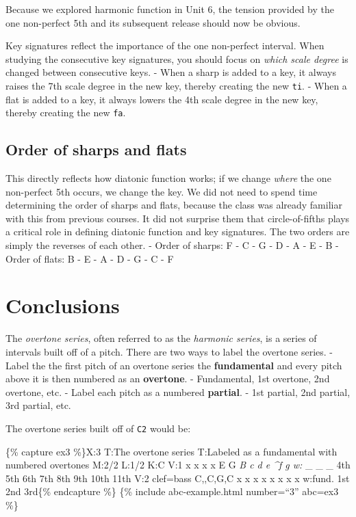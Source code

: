 \documentclass{book}
\begin{document}
Because we explored harmonic function in Unit 6, the tension provided by the
one non-perfect 5th and its subsequent release should now be obvious.

Key signatures reflect the importance of the one non-perfect interval. When
studying the consecutive key signatures, you should focus on \emph{which scale
degree} is changed between consecutive keys. - When a sharp is added to a key,
it always raises the 7th scale degree in the new key, thereby creating the new
\texttt{ti}. - When a flat is added to a key, it always lowers the 4th scale
degree in the new key, thereby creating the new \texttt{fa}.

\hypertarget{order-of-sharps-and-flats}{%
\subsection{Order of sharps and flats}\label{order-of-sharps-and-flats}}

This directly reflects how diatonic function works; if we change \emph{where}
the one non-perfect 5th occurs, we change the key. We did not need to spend
time determining the order of sharps and flats, because the class was already
familiar with this from previous courses. It did not surprise them that
circle-of-fifths plays a critical role in defining diatonic function and key
signatures. The two orders are simply the reverses of each other. - Order of
sharps: F - C - G - D - A - E - B - Order of flats: B - E - A - D - G - C - F

\hypertarget{conclusions-71}{%
\section{Conclusions}\label{conclusions-71}}

The \emph{overtone series}, often referred to as the \emph{harmonic series},
is a series of intervals built off of a pitch. There are two ways to label the
overtone series. - Label the the first pitch of an overtone series the
\textbf{fundamental} and every pitch above it is then numbered as an
\textbf{overtone}. - Fundamental, 1st overtone, 2nd overtone, etc. - Label
each pitch as a numbered \textbf{partial}. - 1st partial, 2nd partial, 3rd
partial, etc.

The overtone series built off of \texttt{C2} would be:

\{\% capture ex3 \%\}X:3 T:The overtone series T:Labeled as a fundamental with
numbered overtones M:2/2 L:1/2 K:C V:1 x x x x E G \emph{B c d e \^{}f
g\textbar{]} w: } \_ \_ \_ 4th 5th 6th 7th 8th 9th 10th 11th V:2 clef=bass
C,,C,G,C x x x x x x x x\textbar{]} w:fund. 1st 2nd 3rd\{\% endcapture \%\}
\{\% include abc-example.html number=``3'' abc=ex3 \%\}
\end{document}
